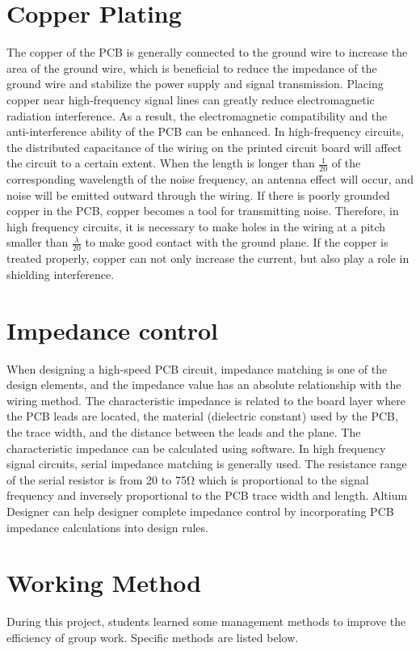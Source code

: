\documentclass[12pt, a4paper]{report}
\begin{document}
\section{Copper Plating}
The copper of the PCB is generally connected to the ground wire to increase the area of the ground wire, which is beneficial to reduce the impedance of the ground wire and stabilize the power supply and signal transmission. Placing copper near high-frequency signal lines can greatly reduce electromagnetic radiation interference. As a result, the electromagnetic compatibility and the anti-interference ability of the PCB can be enhanced. In high-frequency circuits, the distributed capacitance of the wiring on the printed circuit board will affect the circuit to a certain extent. When the length is longer than $\frac{1}{20}$ of the corresponding wavelength of the noise frequency, an antenna effect will occur, and noise will be emitted outward through the wiring. If there is poorly grounded copper in the PCB, copper becomes a tool for transmitting noise. Therefore, in high frequency circuits, it is necessary to make holes in the wiring at a pitch smaller than $\frac{\lambda}{20}$ to make good contact with the ground plane. If the copper is treated properly, copper can not only increase the current, but also play a role in shielding interference.

\section{Impedance control}
When designing a high-speed PCB circuit, impedance matching is one of the design elements, and the impedance value has an absolute relationship with the wiring method. The characteristic impedance is related to the board layer where the PCB leads are located, the material (dielectric constant) used by the PCB, the trace width, and the distance between the leads and the plane. The characteristic impedance can be calculated using software. In high frequency signal circuits, serial impedance matching is generally used. The resistance range of the serial resistor is from 20 to 75Ω which is proportional to the signal frequency and inversely proportional to the PCB trace width and length. Altium Designer can help designer complete impedance control by incorporating PCB impedance calculations into design rules.


\section{Working Method}
During this project, students learned some management methods to improve the efficiency of group work. Specific methods are listed below.
\end{document}
